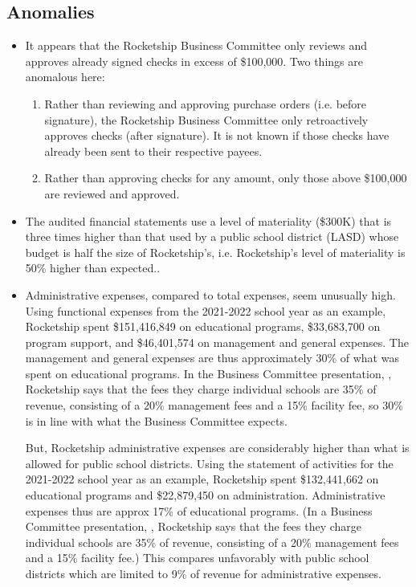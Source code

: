 \subsection{Anomalies}\indent%
\label{sec:anomalies}

\begin{itemize}
  \item It appears that the Rocketship Business Committee only reviews and approves already signed checks in excess of \$100,000. Two things are anomalous here:
  \begin{enumerate}
    \item Rather than reviewing and approving purchase orders (i.e. before signature), the Rocketship Business Committee only retroactively approves checks (after signature). It is not known if those checks have already been sent to their respective payees.
    \item Rather than approving checks for any amount, only those above \$100,000 are reviewed and approved.
  \end{enumerate}
  \item The audited financial statements use a level of materiality (\$300K) that is three times higher than that used by a public school district (LASD) whose budget is half the size of Rocketship's, i.e. Rocketship's level of materiality is 50\% higher than expected..

  \item Administrative expenses, compared to total expenses, seem unusually high. Using functional expenses from the 2021-2022 school year as an example, Rocketship spent \$151,416,849 on educational programs, \$33,683,700 on program support, and \$46,401,574 on management and general expenses.  The management and general expenses are thus approximately 30\% of what was spent on educational programs. In the Business Committee presentation, \textcite{Mukhopadhyay2013}, Rocketship says that the fees they charge individual schools are 35\% of revenue, consisting of a 20\% management fees and a 15\% facility fee, so 30\% is in line with what the Business Committee expects.

  But, Rocketship administrative expenses are considerably higher than what is allowed for public school districts. Using the statement of activities for the 2021-2022 school year as an example, Rocketship spent \$132,441,662 on educational programs and \$22,879,450 on administration.  Administrative expenses thus are approx 17\% of educational programs. (In a  Business Committee presentation, \textcite{Mukhopadhyay2013}, Rocketship says that the fees they charge individual schools are 35\% of revenue, consisting of a 20\% management fees and a 15\% facility fee.) This compares unfavorably with public school districts which are limited to 9\% of revenue for administrative expenses.


\end{itemize}

